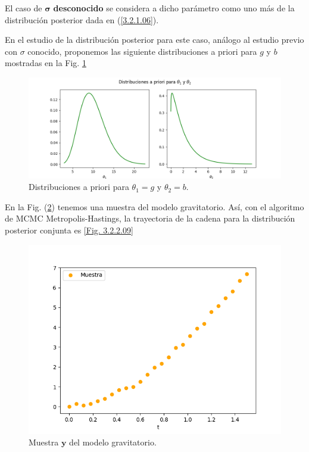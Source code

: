 El caso de $\mathbf{\sigma}$ \textbf{desconocido} se considera a dicho parámetro como uno más de la distribución posterior dada en 
(\ref{3.2.1.06}). 

En el estudio de la distribución posterior para este caso, análogo al estudio previo con $\sigma$ conocido, proponemos las siguiente distribuciones a priori para $g$ y $b$ mostradas en la Fig. \ref{Fig. 3.2.2.07}

\begin{figure}[H] 
    \centering 
    \includegraphics[width = 15 cm]{img/Exp_Central_gravedad_sigma/Figuras/Generales/Apriori_gravedad_sigma.png}     
    \caption{Distribuciones a priori para $\theta_1 = g$ y $\theta_2 = b$.}
    \label{Fig. 3.2.2.07}
\end{figure} 

En la Fig. (\ref{Fig. 3.2.2.08}) tenemos una muestra del modelo gravitatorio. Así, con el algoritmo de MCMC Metropolis-Hastings, la trayectoria de la cadena para la distribución posterior conjunta es \ref{Fig. 3.2.2.09}



\begin{figure}[H] 
    \centering 
    \includegraphics[width = 10 cm ]{img/Exp_Central_gravedad_sigma/Figuras/Generales/Muestra_gravedad_sigma.png} 
    \caption{Muestra $\mathbf{y}$ del modelo gravitatorio.}
    \label{Fig. 3.2.2.08}
\end{figure} 

